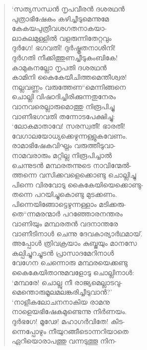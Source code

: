\begin{verse}
‘സത്യസന്ധന്‍ നൃപവീരന്‍ ദശരഥന്‍\\
പുത്രാഭിഷേകം കഴിച്ചീടുമെന്നുമേ\\
കേകയപുത്രീവശഗതനാകയാ-\\
ലാകുലമുള്ളില്‍ വളരുന്നിതേറ്റവും\\
ദുര്‍ഗേ! ഭഗവതി! ദുര്‍ഷ്കൃതനാശിനി!\\
ദുര്‍ഗതി നീക്കിത്തുണച്ചീടുകംബികേ!\\
കാമുകനല്ലോ നൃപതി ദശരഥന്‍\\
കാമിനി കൈകേയീചിത്തമെന്തീശ്വര!\\
നല്ലവണ്ണം വരുത്തേണ“മെന്നിങ്ങനെ\\
ചൊല്ലി വിഷാദിച്ചിരിക്കുന്നതുനേരം\\
വാനവരെല്ലാരുമൊത്തു നിരൂപിച്ചു\\
വാണീഭഗവതി തന്നോടപേക്ഷിച്ചു:\\
‘ലോകമാതാവേ! സരസ്വതീ! ഭാരതീ!\\
വേഗാലയോധ്യക്കെഴുന്നള്ളുകവേണം.\\
രാമാഭിഷേകവിഘ്നം വരുത്തീടുവാ-\\
നാമവരാരും മറ്റില്ല നിരൂപിച്ചാല്‍\\
ചെന്നുടന്‍ മന്ഥരതന്നുടെ നാവിന്മേല്‍-\\
ത്തന്നെ വസിക്കവളെക്കൊണ്ടു ചൊല്ലിച്ചു\\
പിന്നെ വിരവോടു കൈകേയിയെക്കൊണ്ടു-\\
തന്നെ പറയിച്ചുകൊണ്ടു മുടക്കണം.\\
പിന്നെയിങ്ങോട്ടെഴുന്നള്ളാം മടിക്കരു-\\
തെ“ന്നമരന്മാര്‍ പറഞ്ഞോരനന്തരം\\
വാണിയും മന്ഥരതന്‍ വദനാന്തരേ\\
വാണീടിനാള്‍ ചെന്നു ദേവകാര്യാര്‍ഥമായ്.\\
അപ്പോള്‍ ത്രിവക്രയാം കുബ്ജയും മാനസേ\\
കല്പിച്ചുറച്ചുടന്‍ പ്രാസാദമേറിനാള്‍\\
വേഗേന ചെന്നൊരു മന്ഥരയെക്കണ്ടു\\
കൈകേയിതാനുമവളോടു ചൊല്ലിനാള്‍:\\
‘മന്ഥരേ! ചൊല്ലു നീ രാജ്യമെല്ലാടവു-\\
മെന്തൊരുമൂലമലങ്കരിച്ചീടുവാന്‍?’\\
‘നാളീകലോചനനാകിയ രാമനു\\
നാളെയഭിഷേകമുണ്ടെന്നു നിര്‍ണയം.\\
ദുര്‍ഭഗേ! മൂഢേ! മഹാഗര്‍വിതേ! കിട-\\
ന്നെപ്പോഴും നീയുറങ്ങീടൊന്നറിയാതെ\\
ഏറിയൊരാപത്തു വന്നടുത്തൂ നിന-\\

\end{verse}
